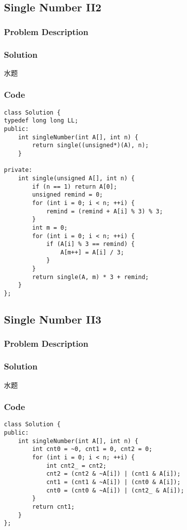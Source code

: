 \documentclass[courier]{article}
\begin{document}
\begin{CJK*}{UTF8}{gkai}
\subsection{ Single Number II2 }

\subsubsection*{Problem Description}


\subsubsection*{Solution}
水题

\subsubsection*{Code}
\begin{lstlisting}
class Solution {
typedef long long LL;
public:
    int singleNumber(int A[], int n) {
        return single((unsigned*)(A), n);
    }

private:
    int single(unsigned A[], int n) {
        if (n == 1) return A[0];
        unsigned remind = 0;
        for (int i = 0; i < n; ++i) {
            remind = (remind + A[i] % 3) % 3;
        }
        int m = 0;
        for (int i = 0; i < n; ++i) {
            if (A[i] % 3 == remind) {
                A[m++] = A[i] / 3;
            }
        }
        return single(A, m) * 3 + remind;
    }
};

\end{lstlisting}


\subsection{ Single Number II3 }

\subsubsection*{Problem Description}


\subsubsection*{Solution}
水题

\subsubsection*{Code}
\begin{lstlisting}
class Solution {
public:
    int singleNumber(int A[], int n) {
        int cnt0 = ~0, cnt1 = 0, cnt2 = 0;
        for (int i = 0; i < n; ++i) {
            int cnt2_ = cnt2;
            cnt2 = (cnt2 & ~A[i]) | (cnt1 & A[i]);
            cnt1 = (cnt1 & ~A[i]) | (cnt0 & A[i]);
            cnt0 = (cnt0 & ~A[i]) | (cnt2_ & A[i]);
        }
        return cnt1;
    }
}; 
\end{lstlisting}



\end{CJK*}
\end{document}
